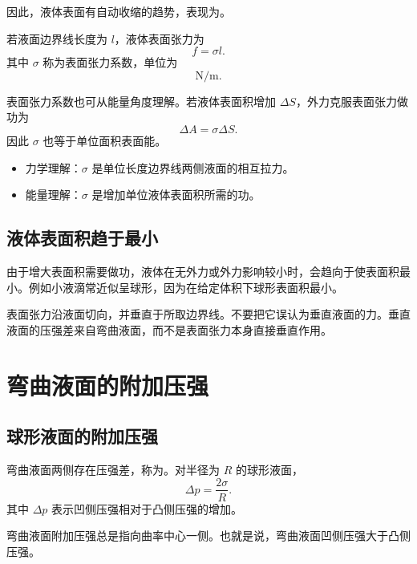 因此，液体表面有自动收缩的趋势，表现为。

\begin{FormulaBox}[表面张力定义]
若液面边界线长度为 \(l\)，液体表面张力为
\[
  \boxed{
  f=\sigma l
  }.
\]
其中 \(\sigma\) 称为表面张力系数，单位为
\[
  \mathrm{N/m}.
\]
\end{FormulaBox}

表面张力系数也可从能量角度理解。若液体表面积增加 \(\Delta S\)，外力克服表面张力做功为
\[
  \boxed{
  \Delta A=\sigma\Delta S
  }.
\]
因此 \(\sigma\) 也等于单位面积表面能。

\begin{KeyBox}[表面张力的两个等价理解]
\begin{itemize}
  \item 力学理解：\(\sigma\) 是单位长度边界线两侧液面的相互拉力。
  \item 能量理解：\(\sigma\) 是增加单位液体表面积所需的功。
\end{itemize}
\end{KeyBox}

\subsection{液体表面积趋于最小}

由于增大表面积需要做功，液体在无外力或外力影响较小时，会趋向于使表面积最小。例如小液滴常近似呈球形，因为在给定体积下球形表面积最小。

\begin{WarnBox}[表面张力方向]
表面张力沿液面切向，并垂直于所取边界线。不要把它误认为垂直液面的力。垂直液面的压强差来自弯曲液面，而不是表面张力本身直接垂直作用。
\end{WarnBox}

\section{弯曲液面的附加压强}

\subsection{球形液面的附加压强}

弯曲液面两侧存在压强差，称为。对半径为 \(R\) 的球形液面，
\[
  \boxed{
  \Delta p=\frac{2\sigma}{R}
  }.
\]
其中 \(\Delta p\) 表示凹侧压强相对于凸侧压强的增加。

\begin{KeyBox}[附加压强方向]
弯曲液面附加压强总是指向曲率中心一侧。也就是说，弯曲液面凹侧压强大于凸侧压强。
\end{KeyBox}

